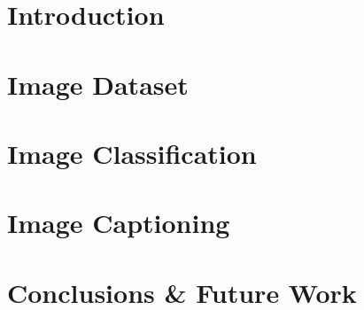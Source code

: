 \documentclass[11pt,titlepage]{report}
\begin{document}
\tableofcontents

\chapter{Introduction}


\chapter{Image Dataset}


\chapter{Image Classification}


\chapter{Image Captioning}


\chapter{Conclusions \& Future Work}


\clearpage

% 
% 

\pagestyle{numberonly}
\printbibliography
\end{document}
